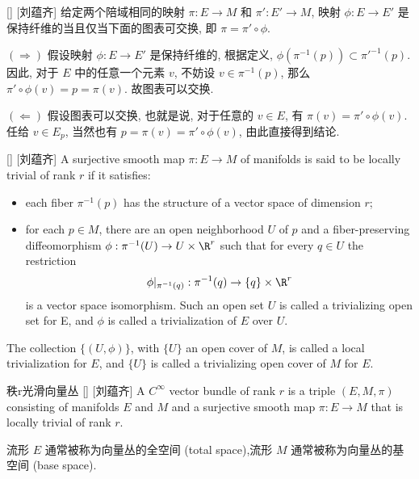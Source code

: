 \documentclass[UTF8]{ctexart}
\begin{document}
        \begin{ppt}
            []
            {}
            []
            [刘蕴齐]
            给定两个陪域相同的映射 \(\pi: E \to M\) 和 \(\pi': E' \to M\), 映射 \(\phi: E \to E'\) 是保持纤维的当且仅当下面的图表可交换, 即 \(\pi = \pi' \circ \phi\). 
        \end{ppt}

        \begin{prf}
             \((\Rightarrow)\)  假设映射 \(\phi: E \to E'\) 是保持纤维的, 根据定义,  \(\phi(\pi^{-1}(p)) \subset \pi'^{-1}(p)\). 因此, 对于 \(E\) 中的任意一个元素 \(v\), 不妨设 \(v \in \pi^{-1}(p)\), 那么 \(\pi' \circ \phi (v) = p = \pi(v)\). 故图表可以交换. 
            
             \((\Leftarrow)\)  假设图表可以交换, 也就是说, 对于任意的 \(v \in  E\), 有 \(\pi(v) = \pi' \circ \phi(v)\). 任给 \(v \in E_p\), 当然也有 \(p = \pi(v) = \pi' \circ \phi(v)\), 由此直接得到结论. 
        \end{prf}

        \begin{dfn}
            []
            {}
            []
            [刘蕴齐]
            A surjective smooth map  \(\pi: E \to M\)  of manifolds is said to be locally trivial of rank  \(r\)  if
            it satisfies:
            \begin{itemize}
                \item each fiber  \(\pi^{-1}(p)\)  has the structure of a vector space of dimension  \(r\);
                \item  for each  \(p \in M\), there are an open neighborhood  \(U\)  of  \(p\)  and a fiber-preserving diffeomorphism  \(\phi: \pi^{-1}(U) \to U \times \R^r\)  such that for every  \(q \in U\)  the restriction
                \[
                    \phi | _{\pi^{-1}(q)}: \pi^{-1}(q) \to \{q\} \times \R^r
                \]
                is a vector space isomorphism. Such an open set  \(U\)  is called a trivializing open set for E, and  \(\phi\)  is called a trivialization of  \(E\)  over  \(U\).
            \end{itemize}
            The collection  \(\{(U,\phi)\}\), with  \(\{U\}\)  an open cover of  \(M\), is called a local trivialization for  \(E\), and  \(\{U\}\)  is called a trivializing open cover of  \(M\)  for  \(E\).
        \end{dfn}
        
        \begin{dfn}
            []
            {秩r光滑向量丛}
            []
            [刘蕴齐]
            A  \(C^{\infty}\)  vector bundle of rank  \(r\)  is a triple  \((E,M,\pi)\)  consisting of manifolds  \(E\)  and  \(M\)  and a surjective smooth map 
             \(\pi: E \to M\)  that is locally trivial of rank  \(r\). 
            
            流形 \(E\) 通常被称为向量丛的全空间 (total space),流形 \(M\) 通常被称为向量丛的基空间 (base space). 
        \end{dfn}
\end{document}
